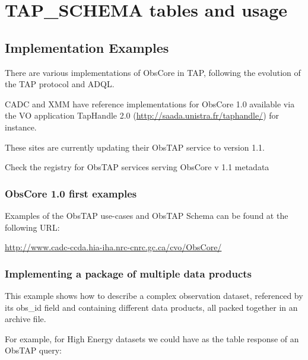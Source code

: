 \documentclass[11pt,a4paper]{ivoa}
\begin{document}
\vspace{0.3cm}

\section{TAP\_SCHEMA tables and usage}
\subsection{Implementation Examples}
There are various implementations of ObsCore in TAP, following the evolution of the TAP protocol and ADQL.

CADC and XMM have reference implementations for ObsCore 1.0 available via the VO application TapHandle 2.0
(\url{http://saada.unistra.fr/taphandle/}) for instance.

These sites are currently updating their ObsTAP service to version 1.1.

Check the registry for ObsTAP services serving ObsCore v 1.1 metadata

\subsubsection{ObsCore 1.0 first examples}
\label{bkm:Ref303703299} Examples of the ObsTAP use-cases and ObsTAP Schema can be found at the following URL:

\url{http://www.cadc-ccda.hia-iha.nrc-cnrc.gc.ca/cvo/ObsCore/}

\subsubsection{Implementing a package of multiple data products}
This example shows how to describe a complex observation dataset, referenced by its obs\_id field and containing
different data products, all packed together in an archive file.

For example, for High Energy datasets we could have as the table response of an ObsTAP query:
\end{document}
